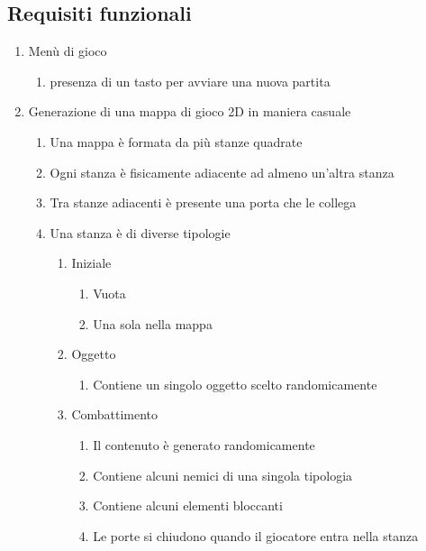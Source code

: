 \subsection{Requisiti funzionali}
\begin{enumerate}
    \item Menù di gioco
    \begin{enumerate}
        \item presenza di un tasto per avviare una nuova partita
    \end{enumerate}
    \item Generazione di una mappa di gioco 2D in maniera casuale
    \begin{enumerate}
        \item Una mappa è formata da più stanze quadrate
        \item Ogni stanza è fisicamente adiacente ad almeno un'altra stanza
        \item Tra stanze adiacenti è presente una porta che le collega
        \item Una stanza è di diverse tipologie
            \begin{enumerate}
                \item Iniziale
                    \begin{enumerate}
                        \item Vuota
                        \item Una sola nella mappa
                    \end{enumerate}
                \item Oggetto
                    \begin{enumerate}
                        \item Contiene un singolo oggetto scelto randomicamente
                    \end{enumerate}
                \item Combattimento
                    \begin{enumerate}
                        \item Il contenuto è generato randomicamente
                        \item Contiene alcuni nemici di una singola tipologia
                        \item Contiene alcuni elementi bloccanti
                        \item Le porte si chiudono quando il giocatore entra nella stanza

\end{enumerate}
\end{enumerate}
\end{enumerate}
\end{enumerate}
